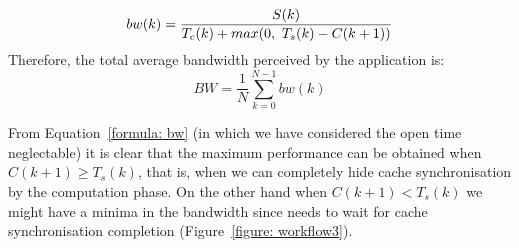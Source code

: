 \begin{equation}\label{formula: bw}
        bw(k) = \frac{S(k)}{T_c(k) + max(0,\ T_s(k) - C(k+1))} \\
\end{equation}
Therefore, the total average bandwidth perceived by the application is:
\begin{equation}\label{formula: abw}
        BW = \frac{1}{N}\sum_{k=0}^{N-1}bw(k)
\end{equation}

From Equation~\ref{formula: bw} (in which we have considered the open time neglectable) it is clear that the maximum performance can be obtained when $C(k+1) \geq T_s(k)$, that is, when we can completely hide cache synchronisation by the computation phase. On the other hand when $C(k+1) < T_s(k)$ we might have a minima in the bandwidth since  needs to wait for cache synchronisation completion (Figure~\ref{figure: workflow3}). 
